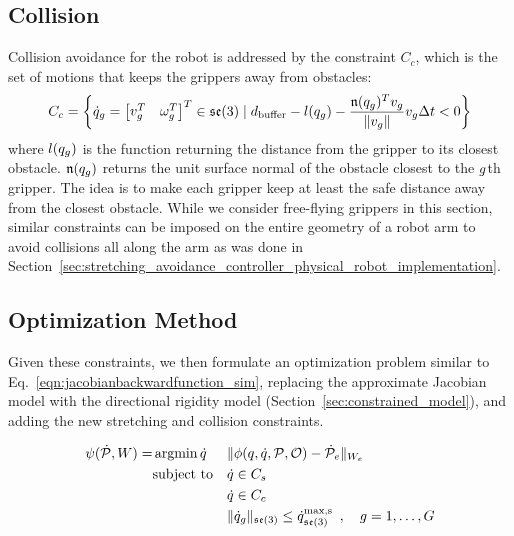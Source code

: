 \subsection{Collision} Collision avoidance for the robot is addressed by the constraint $C_c$, which is the set of motions that keeps the grippers away from obstacles:
\begin{equation}
    C_c = \left\{\dot{q}_g = \begin{bmatrix}v_g^T & \omega_g^T\end{bmatrix}^T \in \mathfrak{se}(3) \mid  d_\textrm{buffer} - l(q_g) - \frac{\mathfrak{n}(q_g)^T v_g}{\|v_g\|} v_g \Delta t < 0\right\}
    \label{Eq:Collision_constraint_Method}
\end{equation}
where $l(q_g)$ is the function returning the distance from the gripper to its closest obstacle. $\mathfrak{n}(q_g)$ returns the unit surface normal of the obstacle closest to the $g$th gripper. The idea is to make each gripper keep at least the safe distance away from the closest obstacle. While we consider free-flying grippers in this section, similar constraints can be imposed on the entire geometry of a robot arm to avoid collisions all along the arm as was done in Section~\ref{sec:stretching_avoidance_controller_physical_robot_implementation}.

\subsection{Optimization Method}

Given these constraints, we then formulate an optimization problem similar to Eq.~\eqref{eqn:jacobianbackwardfunction_sim}, replacing the approximate Jacobian model with the directional rigidity model (Section~\ref{sec:constrained_model}), and adding the new stretching and collision constraints.

\begin{equation}
\begin{aligned}
    \psi(\dot{\mathcal{P}}, W) = 
        & \operatorname*{argmin}{\dot{q}}
            & & \| \phi(q, \dot{q}, \mathcal{P}, \mathcal{O}) - \dot{\mathcal{P}}_e \|_{W_e} \\
        & \textrm{subject to}
            & & \dot{q} \in C_s\\
        &   & & \dot{q} \in C_c\\
        &   & & \| \dot{q}_g \|_{\mathfrak{se}(3)} \leq \dot{q}^\textrm{max,s}_{\mathfrak{se}(3)} \enspace, \quad g = 1, \dots, G
\end{aligned}
\label{Eq:Optimization Problem}
\end{equation}

